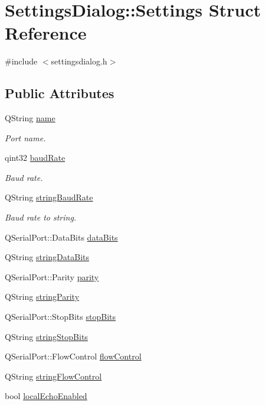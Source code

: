 \hypertarget{struct_settings_dialog_1_1_settings}{}\section{Settings\+Dialog\+:\+:Settings Struct Reference}
\label{struct_settings_dialog_1_1_settings}


{\ttfamily \#include $<$settingsdialog.\+h$>$}

\subsection*{Public Attributes}
\begin{DoxyCompactItemize}
\item 
Q\+String \hyperlink{struct_settings_dialog_1_1_settings_a973c8cfb942a512f34fc4227c0caa6dd}{name}
\begin{DoxyCompactList}\small\item\em Port name. \end{DoxyCompactList}\item 
qint32 \hyperlink{struct_settings_dialog_1_1_settings_ac19cc9431552857a75c657a464ba0700}{baud\+Rate}
\begin{DoxyCompactList}\small\item\em Baud rate. \end{DoxyCompactList}\item 
Q\+String \hyperlink{struct_settings_dialog_1_1_settings_a54e9d461f783386f314bc24b96665e53}{string\+Baud\+Rate}
\begin{DoxyCompactList}\small\item\em Baud rate to string. \end{DoxyCompactList}\item 
Q\+Serial\+Port\+::\+Data\+Bits \hyperlink{struct_settings_dialog_1_1_settings_a7dcd85d028a09508cb4567cf631b40e9}{data\+Bits}
\item 
Q\+String \hyperlink{struct_settings_dialog_1_1_settings_ab589b733b78af17744ab75067bfce051}{string\+Data\+Bits}
\item 
Q\+Serial\+Port\+::\+Parity \hyperlink{struct_settings_dialog_1_1_settings_ae08a00aa2e45218dade9046e3624cce7}{parity}
\item 
Q\+String \hyperlink{struct_settings_dialog_1_1_settings_aa2c662b2fb315f038e827d63d83b059b}{string\+Parity}
\item 
Q\+Serial\+Port\+::\+Stop\+Bits \hyperlink{struct_settings_dialog_1_1_settings_ab88ff384f7c1127bcbe2dd97b49696a4}{stop\+Bits}
\item 
Q\+String \hyperlink{struct_settings_dialog_1_1_settings_abde3c8410f779688ce6c2fcbbbb84f10}{string\+Stop\+Bits}
\item 
Q\+Serial\+Port\+::\+Flow\+Control \hyperlink{struct_settings_dialog_1_1_settings_aa962a6e7dbb8338af154305e4ff46cfc}{flow\+Control}
\item 
Q\+String \hyperlink{struct_settings_dialog_1_1_settings_a1b0a388ec5059bd2628acf9b7728f2f3}{string\+Flow\+Control}
\item 
bool \hyperlink{struct_settings_dialog_1_1_settings_ae1bfec3d6530f9791451d12aacfcb014}{local\+Echo\+Enabled}
\end{DoxyCompactItemize}


